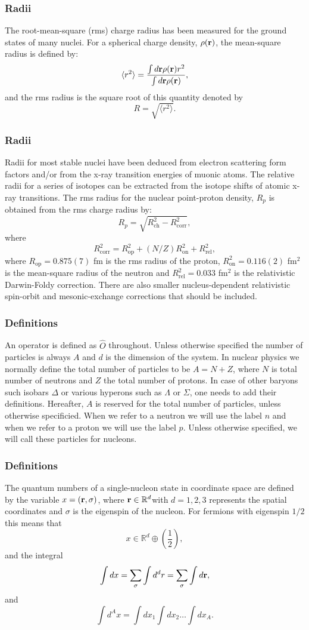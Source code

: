 \documentclass[compress]{beamer}
\begin{document}
\frame
{
  \frametitle{Radii}
\begin{small}
{\scriptsize
The root-mean-square (rms) charge radius has been measured for the ground states of many
nuclei. For a spherical charge density, $\rho({\bf r})$, the mean-square radius is defined by:
\[
\langle r^2\rangle = \frac{ \int  d {\bf r} \rho({\bf r}) r^2}{ \int  d {\bf r} \rho({\bf r})},
\]
and the rms radius is the square root of this quantity denoted by
\[
R =\sqrt{ \langle r^2\rangle}.
\]
}
\end{small}
}

\frame
{
  \frametitle{Radii}
\begin{small}
{\scriptsize

Radii for most stable
nuclei have been deduced from electron scattering form
factors and/or from the x-ray transition energies of muonic atoms. 
The relative radii for a
series of isotopes can be extracted from the isotope shifts of atomic x-ray transitions.
The rms radius for the nuclear point-proton density, $R_p$ is obtained from the rms charge radius by:
\[
R_p = \sqrt{R^2_{\mathrm{ch}}- R^2_{\mathrm{corr}}},
\]
where
\[
R^2_{\mathrm{corr}}= R^2_{\mathrm{op}}+(N/Z)R^2_{\mathrm{on}}+R^2_{\mathrm{rel}},
\]
where $ R_{\mathrm{op}}= 0.875(7)$ fm  is the rms radius of the proton, $R^2_{\mathrm{on}} = 0.116(2)$ fm$^2$ is the
mean-square radius of the neutron and $R^2_{\mathrm{rel}} = 0.033$ fm$^2$ is the relativistic Darwin-Foldy correction. There are also smaller nucleus-dependent relativistic spin-orbit and
mesonic-exchange corrections that should be included.
}
\end{small}
}


\frame
{
\frametitle{Definitions}
An operator is defined as $\hat{O}$ throughout. Unless otherwise
specified the number of particles is always $A$ and $d$ is the dimension of the 
system. 
In nuclear physics we normally define the total number of particles to be $A=N+Z$,
where $N$ is total number of neutrons and $Z$ the total number of protons. In case of other baryons such isobars $\Delta$ or
various hyperons such as $\Lambda$ or $\Sigma$, one needs to add their definitions.  
%
Hereafter, $A$ is reserved for the total number of particles, unless otherwise specificied. When we refer to a neutron we will use the label $n$ and when we refer to a proton we will use the label $p$. Unless otherwise specified, we will call these particles for nucleons.
}



\frame
{
\frametitle{Definitions}
The quantum numbers of a single-nucleon state in coordinate space are
defined by the variable $x=({\bf r},\sigma)$, where ${\bf r}\in {\mathbb{R}}^{d}$with $d=1,2,3$ represents the spatial coordinates and $\sigma$ is the eigenspin of the nucleon. For fermions with eigenspin $1/2$ this means that
\[
 x\in {\mathbb{R}}^{d}\oplus (\frac{1}{2}),
\]
and the integral
\[
\int dx = \sum_{\sigma}\int d^dr = \sum_{\sigma}\int d{\bf r},
\]
and
\[
\int d^Ax= \int dx_1\int dx_2\dots\int dx_A.
\]

}
\end{document}
